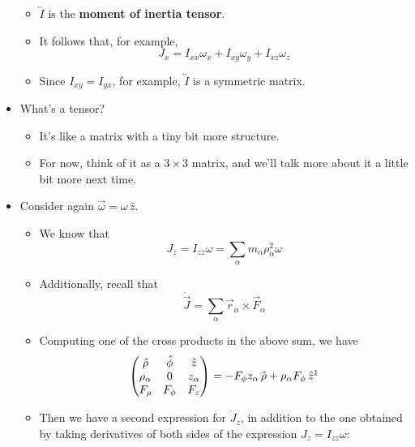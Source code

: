 \documentclass[../notes.tex]{subfiles}
\begin{document}
\begin{itemize}
\begin{itemize}
        \item $\overleftrightarrow{I}$ is the \textbf{moment of inertia tensor}.
        \item It follows that, for example,
        \begin{equation*}
            J_x = I_{xx}\omega_x+I_{xy}\omega_y+I_{xz}\omega_z
        \end{equation*}
        \item Since $I_{xy}=I_{yx}$, for example, $\overleftrightarrow{I}$ is a symmetric matrix.
    \end{itemize}
    \item What's a tensor?
    \begin{itemize}
        \item It's like a matrix with a tiny bit more structure.
        \item For now, think of it as a $3\times 3$ matrix, and we'll talk more about it a little bit more next time.
    \end{itemize}
    \item Consider again $\vec{\omega}=\omega\,\hat{z}$.
    \begin{itemize}
        \item We know that
        \begin{equation*}
            J_z = I_{zz}\omega
            = \sum_\alpha m_\alpha\rho_\alpha^2\omega
        \end{equation*}
        \item Additionally, recall that
        \begin{equation*}
            \dot{\vec{J}} = \sum_\alpha\vec{r}_\alpha\times\vec{F}_\alpha
        \end{equation*}
        \item Computing one of the cross products in the above sum, we have
        \begin{equation*}
            \begin{pmatrix}
                \hat{\rho} & \hat{\phi} & \hat{z}\\
                \rho_\alpha & 0 & z_\alpha\\
                F_\rho & F_\phi & F_z\\
            \end{pmatrix}
            = -F_\phi z_\alpha\,\hat{\rho}+\rho_\alpha F_\phi\,\hat{z}\footnotemark
        \end{equation*}
        \item Then we have a second expression for $\dot{J}_z$, in addition to the one obtained by taking derivatives of both sides of the expression $J_z=I_{zz}\omega$:

\end{itemize}
\end{itemize}
\end{document}
